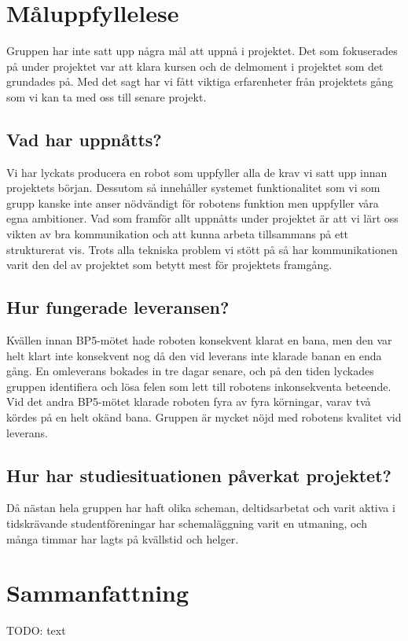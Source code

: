 \documentclass{article}
\begin{document}
\clearpage
\section{Måluppfyllelese}
Gruppen har inte satt upp några mål att uppnå i projektet. Det som fokuserades på under projektet var att klara kursen och de delmoment i projektet som det grundades på. Med det sagt har vi fått viktiga erfarenheter från projektets gång som vi kan ta med oss till senare projekt.

\subsection{Vad har uppnåtts?}
Vi har lyckats producera en robot som uppfyller alla de krav vi satt upp innan projektets början. Dessutom så innehåller systemet funktionalitet som vi som grupp kanske inte anser nödvändigt för robotens funktion men uppfyller våra egna ambitioner. Vad som framför allt uppnåtts under projektet är att vi lärt oss vikten av bra kommunikation och att kunna arbeta tillsammans på ett strukturerat vis. Trots alla tekniska problem vi stött på så har kommunikationen varit den del av projektet som betytt mest för projektets framgång.

\subsection{Hur fungerade leveransen?}
Kvällen innan BP5-mötet hade roboten konsekvent klarat en bana, men den var helt klart inte konsekvent nog då den vid leverans inte klarade banan en enda gång. En omleverans bokades in tre dagar senare, och på den tiden lyckades gruppen identifiera och lösa felen som lett till robotens inkonsekventa beteende. Vid det andra BP5-mötet klarade roboten fyra av fyra körningar, varav två kördes på en helt okänd bana. Gruppen är mycket nöjd med robotens kvalitet vid leverans.

\subsection{Hur har studiesituationen påverkat projektet?}
Då nästan hela gruppen har haft olika scheman, deltidsarbetat och varit aktiva i tidskrävande studentföreningar har schemaläggning varit en utmaning, och många timmar har lagts på kvällstid och helger. 

\clearpage
\section{Sammanfattning}
TODO: text
\end{document}
